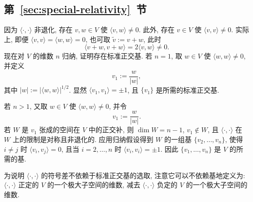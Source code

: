 \subsection{\texorpdfstring{第~\ref{sec:special-relativity}~节}{狭义相对论}}\label{subsec:solutions-special-relativity}

\begin{description}[font=\normalfont,leftmargin=2em,labelwidth=1.5em]
因为 $\langle\cdot,\cdot\rangle$ 非退化, 存在 $v,w\in V$ 使 $\langle v,w\rangle\ne0$. 此外, 存在 $v\in V$ 使 $\langle v,v\rangle\ne0$. 实际上, 即便 $\langle v,v\rangle=\langle w,w\rangle=0$, 也可取 $\widetilde v:=v+w$, 此时
\[
  \langle v+w,v+w\rangle=2\langle v,w\rangle\ne0.
\]
现在对 $V$ 的维数 $n$ 归纳, 证明存在标准正交基. 若 $n=1$, 取 $w\in V$ 使 $\langle w,w\rangle\ne0$, 并定义
\[
  v_1:=\frac{w}{|w|},
\]
其中 $|w|:=|\langle w,w\rangle|^{1/2}$. 显然 $\langle v_1,v_1\rangle=\pm1$, 且 $\{v_1\}$ 是所需的标准正交基.

若 $n>1$, 又取 $w\in V$ 使 $\langle w,w\rangle\ne0$, 并令
\[
  v_1:=\frac{w}{|w|}.
\]
若 $W$ 是 $v_1$ 张成的空间在 $V$ 中的正交补, 则 $\dim W=n-1$, $v_1\notin W$, 且 $\langle\cdot,\cdot\rangle$ 在 $W$ 上的限制是对称且非退化的. 应用归纳假设得到 $W$ 的一组基 $\{v_2,\ldots,v_n\}$, 使得 $i\ne j$ 时 $\langle v_i,v_j\rangle=0$, 且当 $i=2,\ldots,n$ 时 $\langle v_i,v_i\rangle=\pm1$. 因此 $\{v_1,\ldots,v_n\}$ 是 $V$ 的所需的基.

为说明 $\langle\cdot,\cdot\rangle$ 的符号差不依赖于标准正交基的选取, 注意它可以不依赖基地定义为: $\langle\cdot,\cdot\rangle$ 正定的 $V$ 的一个极大子空间的维数, 减去 $\langle\cdot,\cdot\rangle$ 负定的 $V$ 的一个极大子空间的维数.


\end{description}
